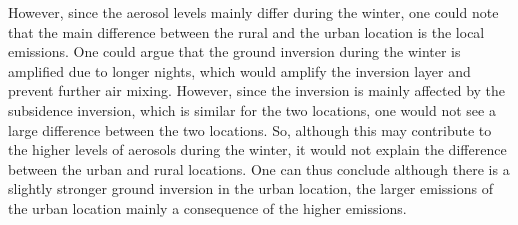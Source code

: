 However, since the aerosol levels mainly differ during the winter, one could note that the main difference between the rural and the urban location is the local emissions. One could argue that the ground inversion during the winter is amplified due to longer nights, which would amplify the inversion layer and prevent further air mixing. However, since the inversion is mainly affected by the subsidence inversion, which is similar for the two locations, one would not see a large difference between the two locations. So, although this may contribute to the higher levels of aerosols during the winter, it would not explain the difference between the urban and rural locations. One can thus conclude although there is a slightly stronger ground inversion in the urban location, the larger emissions of the urban location mainly a consequence of the higher emissions.
